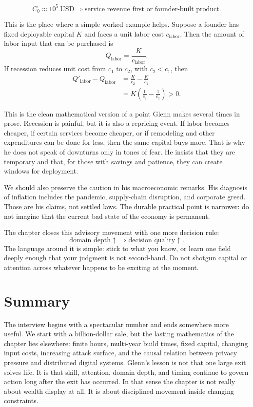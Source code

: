 \begin{equation}
C_{0} \approx 10^{5}\ \mathrm{USD}
\Longrightarrow \text{service revenue first or founder-built product.}
\end{equation}

This is the place where a simple worked example helps. Suppose a founder has fixed deployable capital \(K\) and faces a unit labor cost \(c_{\mathrm{labor}}\). Then the amount of labor input that can be purchased is
\begin{equation}
Q_{\mathrm{labor}}=\frac{K}{c_{\mathrm{labor}}}.
\end{equation}
If recession reduces unit cost from \(c_{1}\) to \(c_{2}\), with \(c_{2}<c_{1}\), then
\begin{align}
Q'_{\mathrm{labor}}-Q_{\mathrm{labor}}
&= \frac{K}{c_{2}}-\frac{K}{c_{1}} \\
&= K\left(\frac{1}{c_{2}}-\frac{1}{c_{1}}\right) > 0.
\end{align}

This is the clean mathematical version of a point Glenn makes several times in prose. Recession is painful, but it is also a repricing event. If labor becomes cheaper, if certain services become cheaper, or if remodeling and other expenditures can be done for less, then the same capital buys more. That is why he does not speak of downturns only in tones of fear. He insists that they are temporary and that, for those with savings and patience, they can create windows for deployment.

We should also preserve the caution in his macroeconomic remarks. His diagnosis of inflation includes the pandemic, supply-chain disruption, and corporate greed. Those are his claims, not settled laws. The durable practical point is narrower: do not imagine that the current bad state of the economy is permanent.

The chapter closes this advisory movement with one more decision rule:
\begin{equation}
\text{domain depth}\uparrow \Longrightarrow \text{decision quality}\uparrow.
\end{equation}
The language around it is simple: stick to what you know, or learn one field deeply enough that your judgment is not second-hand. Do not shotgun capital or attention across whatever happens to be exciting at the moment.

\section{Summary}

The interview begins with a spectacular number and ends somewhere more useful. We start with a billion-dollar sale, but the lasting mathematics of the chapter lies elsewhere: finite hours, multi-year build times, fixed capital, changing input costs, increasing attack surface, and the causal relation between privacy pressure and distributed digital systems. Glenn's lesson is not that one large exit solves life. It is that skill, attention, domain depth, and timing continue to govern action long after the exit has occurred. In that sense the chapter is not really about wealth display at all. It is about disciplined movement inside changing constraints.